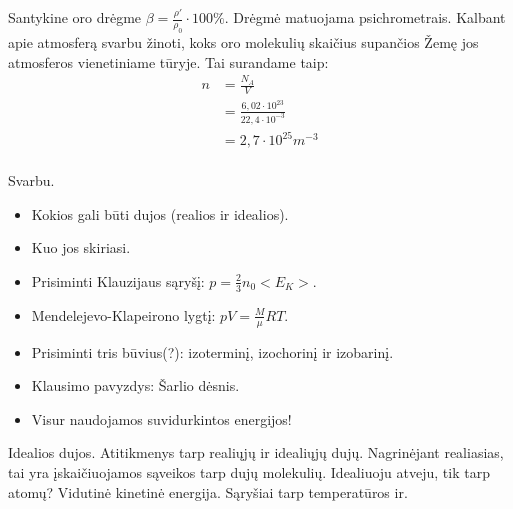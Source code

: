 Santykine oro drėgme $\beta = \frac{\rho'}{\rho_{0}} \cdot 100 \%$.
Drėgmė matuojama psichrometrais. Kalbant apie atmosferą svarbu
žinoti, koks oro molekulių skaičius supančios Žemę jos atmosferos
vienetiniame tūryje. Tai surandame taip:
\begin{align*}
  n
  &= \frac{N_{A}}{V} \\
  &= \frac{6,02 \cdot 10^{23}}{22,4 \cdot 10 ^{-3}} \\
  &= 2,7 \cdot 10 ^{25} m^{-3} \\
\end{align*}

Svarbu.
\begin{itemize}
  \item Kokios gali būti dujos (realios ir idealios).
  \item Kuo jos skiriasi.
  \item Prisiminti Klauzijaus sąryšį: $p = \frac{2}{3} n_{0} <E_{K}>$.
  \item Mendelejevo-Klapeirono lygtį: $pV = \frac{M}{\mu}RT$.
  \item Prisiminti tris būvius(?): izoterminį, izochorinį ir izobarinį.
  \item Klausimo pavyzdys: Šarlio dėsnis.
  \item Visur naudojamos suvidurkintos energijos!
\end{itemize}

Idealios dujos. Atitikmenys tarp realiųjų ir idealiųjų dujų. Nagrinėjant
realiasias, tai yra įskaičiuojamos sąveikos tarp dujų molekulių. Idealiuoju
atveju, tik tarp atomų? Vidutinė kinetinė energija. Sąryšiai tarp
temperatūros ir.
